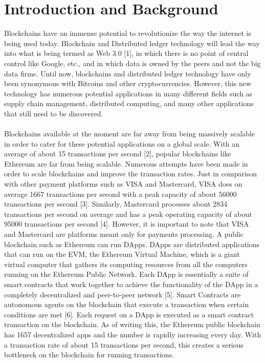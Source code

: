 \documentclass[a4paper,twoside,phd]{BYUPhys}
\begin{document}
\section{Introduction and Background}
Blockchains have an immense potential to revolutionize the way the internet is being used today. Blockchain and Distributed ledger technology will lead the way into what is being termed as Web 3.0 [1], in which there is no point of central control like Google, etc., and in which data is owned by the peers and not the big data firms. Until now, blockchains and distributed ledger technology have only been synonymous with Bitcoins and other cryptocurrencies. However, this new technology has numerous potential applications in many different fields such as supply chain management, distributed computing, and many other applications that still need to be discovered.
\\
\\
Blockchains available at the moment are far away from being massively scalable in order to cater for these potential applications on a global scale. With an average of about 15 transactions per second [2], popular blockchains like Ethereum are far from being scalable. Numerous attempts have been made in order to scale blockchains and improve the transaction rates. Just in comparison with other payment platforms such as VISA and Mastercard, VISA does on average 1667 transactions per second with a peak capacity of about 56000 transactions per second [3]. Similarly, Mastercard processes about 2834 transactions per second on average and has a peak operating capacity of about 95000 transactions per second [4]. However, it is important to note that VISA and Mastercard are platforms meant only for payments processing. A public blockchain such as Ethereum can run DApps. DApps are distributed applications that can run on the EVM, the Ethereum Virtual Machine, which is a giant virtual computer that gathers its computing resources from all the computers running on the Ethereum Public Network. Each DApp is essentially a suite of smart contracts that work together to achieve the functionality of the DApp in a completely decentralized and peer-to-peer network [5]. Smart Contracts are autonomous agents on the blockchain that execute a transaction when certain conditions are met [6]. Each request on a DApp is executed as a smart contract transaction on the blockchain. As of writing this, the Ethereum public blockchain has 1657 decentralized apps and the number is rapidly increasing every day. With a transaction rate of about 15 transactions per second, this creates a serious bottleneck on the blockchain for running transactions.
\end{document}
